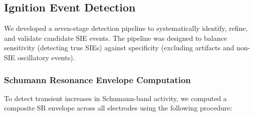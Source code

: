 \documentclass[11pt,a4paper]{article}
\begin{document}
\subsection{Ignition Event Detection}

We developed a seven-stage detection pipeline to systematically identify, refine, and validate candidate SIE events. The pipeline was designed to balance sensitivity (detecting true SIEs) against specificity (excluding artifacts and non-SIE oscillatory events).

\subsubsection{Schumann Resonance Envelope Computation}
To detect transient increases in Schumann-band activity, we computed a composite SR envelope across all electrodes using the following procedure:
\end{document}
